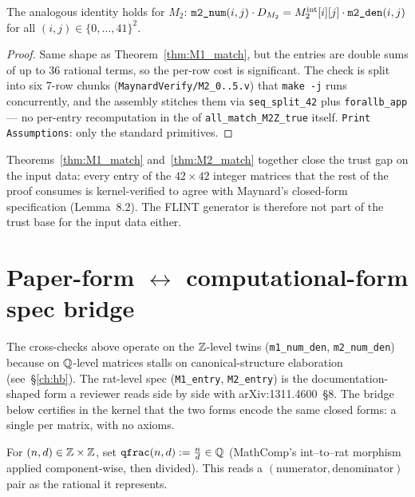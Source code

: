 \begin{theorem}\label{thm:M2_match}
\rocqok
{}
The analogous identity holds for $M_2$:
$\texttt{m2\_num}(i, j) \cdot D_{M_2}
   = M_2^{\mathrm{int}}[i][j] \cdot \texttt{m2\_den}(i, j)$
for all $(i, j) \in \{0, \ldots, 41\}^2$.
\end{theorem}
\begin{proof}\rocqok
Same shape as Theorem~\ref{thm:M1_match}, but the entries are double
sums of up to 36 rational terms, so the per-row \vmcompute{} cost is
significant. The check is split into six 7-row chunks
(\texttt{MaynardVerify/M2\_0..5.v}) that \texttt{make -j} runs
concurrently, and the assembly stitches them via \texttt{seq\_split\_42}
plus \texttt{forallb\_app} — no per-entry recomputation in the
\Qed{} of \texttt{all\_match\_M2Z\_true} itself.
\texttt{Print Assumptions}: only the standard \Uintsf{} primitives.
\end{proof}

\begin{remark}
Theorems~\ref{thm:M1_match} and~\ref{thm:M2_match} together close the
trust gap on the input data: every entry of the $42 \times 42$ integer
matrices that the rest of the proof consumes is kernel-verified to
agree with Maynard's closed-form specification (Lemma~8.2). The FLINT
generator is therefore not part of the trust base for the input data
either.
\end{remark}

\section{Paper-form $\leftrightarrow$ computational-form spec bridge}

The cross-checks above operate on the $\mathbb{Z}$-level twins
(\texttt{m1\_num\_den}, \texttt{m2\_num\_den}) because \vmcompute{} on
$\mathbb{Q}$-level matrices stalls on canonical-structure elaboration
(see~\S\ref{ch:hb}). The rat-level spec
(\texttt{M1\_entry}, \texttt{M2\_entry}) is the
documentation-shaped form a reviewer reads side by side with
arXiv:1311.4600~\S8. The bridge below certifies in the kernel that the
two forms encode the same closed forms: a single \Qed{} per matrix,
with no axioms.

\begin{definition}\label{def:qfrac}
\rocqok
For $(n, d) \in \mathbb{Z} \times \mathbb{Z}$, set
$\texttt{qfrac}(n, d) := \frac{n}{d} \in \mathbb{Q}$
(MathComp's int--to--rat morphism applied component-wise, then divided).
This reads a $(\text{numerator}, \text{denominator})$ pair as the
rational it represents.
\end{definition}


